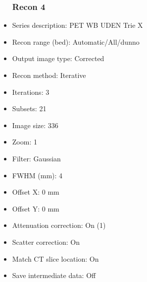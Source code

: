 \documentclass[12pt]{article}
\begin{document}
\begin{itemize}
\subsubsection{Recon 4}
\item Series description: PET WB UDEN Trie X
\item Recon range (bed): Automatic/All/dunno
\item Output image type: Corrected
\item Recon method: Iterative
\item Iterations: 3
\item Subsets: 21
\item Image size: 336
\item Zoom: 1
\item Filter: Gaussian
\item FWHM (mm): 4
\item Offset X: 0 mm
\item Offset Y: 0 mm
\item Attenuation correction: On (1)
\item Scatter correction: On
\item Match CT slice location: On
\item Save intermediate data: Off
\end{itemize}
\end{document}

